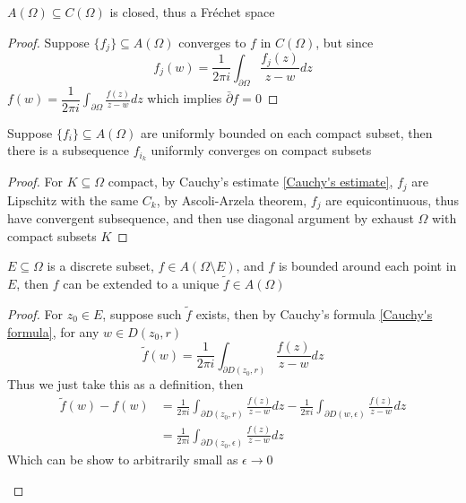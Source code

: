 \documentclass[../main.tex]{subfiles}
\begin{document}
\begin{corollary}
$A(\Omega)\subseteq C(\Omega)$ is closed, thus a Fr\'echet space
\end{corollary}

\begin{proof}
Suppose $\{f_j\}\subseteq A(\Omega)$ converges to $f$ in $C(\Omega)$, but since
\[f_j(w)=\frac{1}{2\pi i}\int_{\partial \Omega}\frac{f_j(z)}{z-w}dz\]
$f(w)=\displaystyle\dfrac{1}{2\pi i}\int_{\partial \Omega}\frac{f(z)}{z-w}dz$ which implies $\bar\partial f=0$
\end{proof}

\begin{theorem}\label{Montel's theorem}
Suppose $\{f_i\}\subseteq A(\Omega)$ are uniformly bounded on each compact subset, then there is a subsequence $f_{i_k}$ uniformly converges on compact subsets
\end{theorem}

\begin{proof}
For $K\subseteq\Omega$ compact, by Cauchy's estimate \ref{Cauchy's estimate}, $f_j$ are Lipschitz with the same $C_k$, by Ascoli-Arzela theorem, $f_j$ are equicontinuous, thus have convergent subsequence, and then use diagonal argument by exhaust $\Omega$ with compact subsets $K$
\end{proof}

\begin{theorem}\label{Riemann extension theorem}
$E\subseteq\Omega$ is a discrete subset, $f\in A(\Omega\setminus E)$, and $f$ is bounded around each point in $E$, then $f$ can be extended to a unique $\tilde f\in A(\Omega)$
\end{theorem}

\begin{proof}
For $z_0\in E$, suppose such $\tilde f$ exists, then by Cauchy's formula \ref{Cauchy's formula}, for any $w\in D(z_0,r)$
\[\tilde f(w)=\frac{1}{2\pi i}\int_{\partial D(z_0,r)}\frac{f(z)}{z-w}dz\]
Thus we just take this as a definition, then
\begin{align*}
\tilde f(w)-f(w)&=\frac{1}{2\pi i}\int_{\partial D(z_0,r)}\frac{f(z)}{z-w}dz-\frac{1}{2\pi i}\int_{\partial D(w,\epsilon)}\frac{f(z)}{z-w}dz \\
&=\frac{1}{2\pi i}\int_{\partial D(z_0,\epsilon)}\frac{f(z)}{z-w}dz
\end{align*}
Which can be show to arbitrarily small as $\epsilon\to0$
\begin{center}
\end{center}
\end{proof}
\end{document}
